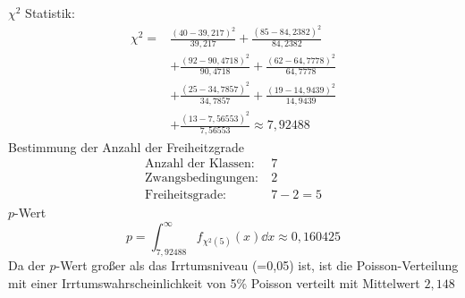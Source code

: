 \documentclass[prb,12pt]{revtex4-2}
\theoremstyle{definition}
\theoremstyle{definition}
\begin{document}
$\chi^2$ Statistik:
\begin{align*}
	\chi^2 =& \frac{(40 - 39,217)^2}{39,217}+\frac{(85 - 84,2382)^2}{84,2382}\\
	&+\frac{(92 - 90,4718)^2}{90,4718}+\frac{(62 - 64,7778)^2}{64,7778}\\
	&+\frac{(25 - 34,7857)^2}{34,7857}+\frac{(19 - 14,9439)^2}{14,9439}\\
	&+\frac{(13 - 7,56553)^2}{7,56553}\approx 7,92488
\end{align*}
Bestimmung der Anzahl der Freiheitzgrade
\begin{align*}
\text{Anzahl der Klassen:}&~7\\
\text{Zwangsbedingungen:}&~2\\
\text{Freiheitsgrade:}&~7-2=5
\end{align*}
$p$-Wert
\[p=\int_{7,92488}^\infty f_{\chi^2(5)}(x) \dd{x}\approx 0,160425\]
Da der $p$-Wert großer als das Irrtumsniveau (=0,05) ist, ist die Poisson-Verteilung mit einer Irrtumswahrscheinlichkeit von 5\% Poisson verteilt mit Mittelwert $2,148$
\end{document}
